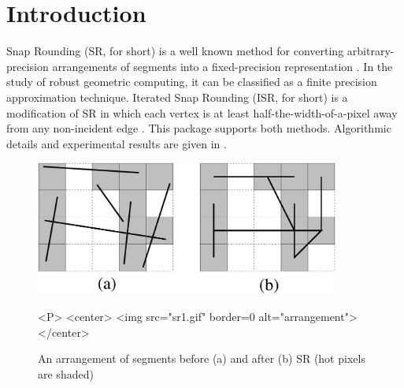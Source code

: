 \newcommand{\reals}{{\rm I\!\hspace{-0.025em} R}}

\def\A{{\cal A}}
\def\S{{\cal S}}

\section{Introduction}
Snap Rounding (SR, for short) is a well known method for converting
arbitrary-precision arrangements of segments into a fixed-precision
representation \cite{gght-srlse-97, gm-rad-98, h-psifp-99}. In
the study of robust geometric computing, it can be classified
as a finite precision approximation technique. Iterated Snap Rounding
(ISR, for short) is a modification of SR in which each vertex is at least
half-the-width-of-a-pixel away from any non-incident edge
\cite{cgal:hp-isr-02}. This package supports both methods. Algorithmic
details and experimental results are given in \cite{cgal:hp-isr-02}.

\begin{figure}
\begin{ccTexOnly}
\centerline{\includegraphics[width=10cm]{Snap_rounding_2/sr1}}
\end{ccTexOnly}

\caption{An arrangement of segments before (a) and after (b)
SR (hot pixels are shaded)}
\label{fig:sr1}

\begin{ccHtmlOnly}
<P>
<center>
  <img src="sr1.gif"  border=0 alt="arrangement">
</center>
\end{ccHtmlOnly}
\end{figure}

